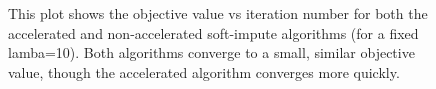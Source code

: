 \begin{figure}[h!tbp]
        \caption{This plot shows the objective value vs iteration number for
        both the accelerated and non-accelerated soft-impute algorithms (for a
        fixed lamba=10). Both algorithms converge to a small, similar objective
        value, though the accelerated algorithm converges more quickly.}
\end{figure}

